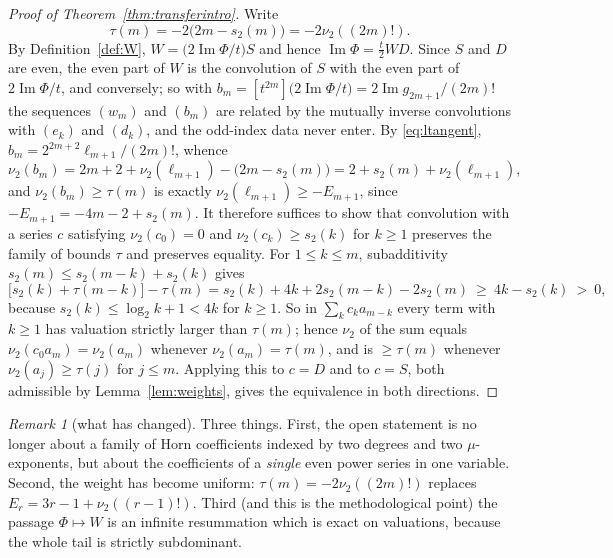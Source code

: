 \documentclass[12pt]{amsart}
\theoremstyle{definition}
\theoremstyle{remark}
\newtheorem{remark}[theorem]{Remark}
\begin{document}
\begin{proof}[Proof of Theorem~\ref{thm:transferintro}]
Write 
\[
\tau(m)=-2\bigl(2m-s_2(m)\bigr)=-2\nu_2((2m)!).  
\]
By Definition~\ref{def:W}, $W=\bigl(2\operatorname{Im}\Phi/t\bigr)S$ and hence $\operatorname{Im}\Phi=\frac t2WD$.  Since $S$ and $D$ are even, the even part of $W$ is the convolution of $S$ with the even part of $2\operatorname{Im}\Phi/t$, and conversely; so with
$b_m=[t^{2m}]\bigl(2\operatorname{Im}\Phi/t\bigr) =2\operatorname{Im}g_{2m+1}/(2m)!$ the sequences $(w_m)$ and $(b_m)$ are related by the mutually inverse convolutions with $(e_k)$ and $(d_k)$, and the odd-index data never enter.  By \eqref{eq:ltangent}, $b_m=2^{2m+2}\ell_{m+1}/(2m)!$, whence
\[
  \nu_2(b_m)=2m+2+\nu_2(\ell_{m+1})-\bigl(2m-s_2(m)\bigr)            =2+s_2(m)+\nu_2(\ell_{m+1}),
\]
and $\nu_2(b_m)\ge\tau(m)$ is exactly $\nu_2(\ell_{m+1})\ge-E_{m+1}$, since $-E_{m+1}=-4m-2+s_2(m)$.  It therefore suffices to show that convolution with a series $c$ satisfying $\nu_2(c_0)=0$ and $\nu_2(c_k)\ge s_2(k)$ for $k\ge1$ preserves the family of bounds $\tau$ and preserves equality.  For $1\le k\le m$, subadditivity $s_2(m)\le s_2(m-k)+s_2(k)$ gives
\[
  \bigl[s_2(k)+\tau(m-k)\bigr]-\tau(m)  =s_2(k)+4k+2s_2(m-k)-2s_2(m)\ \ge\ 4k-s_2(k)\ >\ 0,
\]
because $s_2(k)\le\log_2k+1<4k$ for $k\ge1$.  So in $\sum_kc_ka_{m-k}$ every term with $k\ge1$ has valuation strictly larger than $\tau(m)$; hence $\nu_2$ of the sum equals $\nu_2(c_0a_m)=\nu_2(a_m)$ whenever $\nu_2(a_m)=\tau(m)$, and is $\ge\tau(m)$ whenever $\nu_2(a_j)\ge\tau(j)$ for $j\le m$.  Applying this to $c=D$ and to $c=S$, both admissible by Lemma~\ref{lem:weights}, gives the equivalence in both directions.
\end{proof}

\begin{remark}[what has changed]
Three things.  First, the open statement is no longer about a family of Horn coefficients indexed by two degrees and two $\mu$-exponents, but about the coefficients of a \emph{single} even power series in one variable.  Second, the weight has become uniform: $\tau(m)=-2\nu_2((2m)!)$ replaces $E_r=3r-1+\nu_2((r-1)!)$.  Third (and this is the methodological point) the passage $\Phi\mapsto W$ is an infinite resummation which is exact on valuations, because the whole tail is strictly subdominant.
\end{remark}
\end{document}
